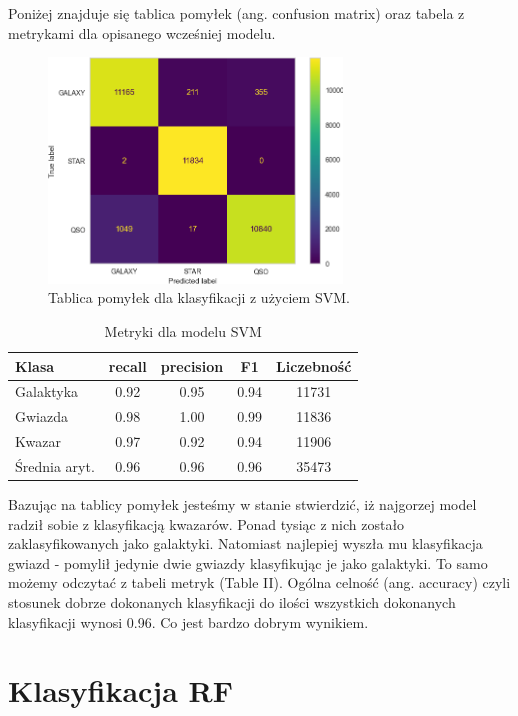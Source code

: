 \documentclass[conference]{IEEEtran}
\begin{document}
Poniżej znajduje się tablica pomyłek (ang. confusion matrix) oraz tabela z metrykami dla opisanego wcześniej modelu.
\begin{figure}[ht]
        \centering
        \includegraphics[width = 7.8cm]{figures/svm_conf_mat.png}
        \caption{Tablica pomyłek dla klasyfikacji z użyciem SVM.}
\end{figure} 
\begin{table}[ht]
    \centering
    \begin{tabular}{|l|c|c|c|c|}
        \hline
        Klasa & recall & precision &  F1 & Liczebność\\
        \hline
        Galaktyka & 0.92 & 0.95 & 0.94 & 11731 \\
        \hline
        Gwiazda & 0.98 & 1.00 & 0.99 & 11836 \\
        \hline
        Kwazar & 0.97 & 0.92 & 0.94 & 11906 \\
        \hline
        Średnia aryt. & 0.96 & 0.96 & 0.96 & 35473 \\
        \hline
    \end{tabular}
    \caption{Metryki dla modelu SVM}
\end{table} 

Bazując na tablicy pomyłek jesteśmy w stanie stwierdzić, iż najgorzej model radził sobie z klasyfikacją kwazarów. Ponad tysiąc z nich zostało zaklasyfikowanych jako galaktyki. Natomiast najlepiej wyszła mu klasyfikacja gwiazd - pomylił jedynie dwie gwiazdy klasyfikując je jako galaktyki. 
To samo możemy odczytać z tabeli metryk (Table II). Ogólna celność (ang. accuracy) czyli stosunek dobrze dokonanych klasyfikacji do ilości wszystkich dokonanych klasyfikacji wynosi 0.96. Co jest bardzo dobrym wynikiem. 
\section{Klasyfikacja RF}
 
\end{document}
